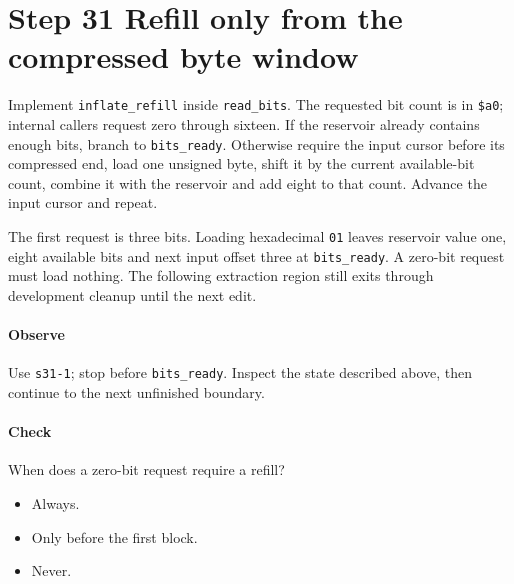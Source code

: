 \section{Step 31 Refill only from the compressed byte window}\label{png-inflate-s31}
Implement \texttt{inflate\_refill} inside \texttt{read\_bits}. The requested bit count is in \texttt{\$a0}; internal callers request zero through sixteen. If the reservoir already contains enough bits, branch to \texttt{bits\_ready}. Otherwise require the input cursor before its compressed end, load one unsigned byte, shift it by the current available-bit count, combine it with the reservoir and add eight to that count. Advance the input cursor and repeat.

The first request is three bits. Loading hexadecimal \texttt{01} leaves reservoir value one, eight available bits and next input offset three at \texttt{bits\_ready}. A zero-bit request must load nothing. The following extraction region still exits through development cleanup until the next edit.

\paragraph{Observe} Use \texttt{s31-1}; stop before \texttt{bits\_ready}. Inspect the state described above, then continue to the next unfinished boundary.

\paragraph{Check} When does a zero-bit request require a refill?
\begin{itemize}
\item[A.] Always.
\item[B.] Only before the first block.
\item[C.] Never.
\end{itemize}
